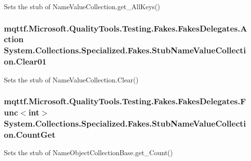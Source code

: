 Sets the stub of Name\-Value\-Collection.\-get\-\_\-\-All\-Keys()

\hypertarget{class_system_1_1_collections_1_1_specialized_1_1_fakes_1_1_stub_name_value_collection_a27dffdd7ba71b6511a9bd481575f807c}{
\subsubsection[{Clear01}]{\setlength{\rightskip}{0pt plus 5cm}mqttf.\-Microsoft.\-Quality\-Tools.\-Testing.\-Fakes.\-Fakes\-Delegates.\-Action System.\-Collections.\-Specialized.\-Fakes.\-Stub\-Name\-Value\-Collection.\-Clear01}}\label{class_system_1_1_collections_1_1_specialized_1_1_fakes_1_1_stub_name_value_collection_a27dffdd7ba71b6511a9bd481575f807c}


Sets the stub of Name\-Value\-Collection.\-Clear()

\hypertarget{class_system_1_1_collections_1_1_specialized_1_1_fakes_1_1_stub_name_value_collection_ae178f5c4fb015139f88001d0e50e035a}{
\subsubsection[{Count\-Get}]{\setlength{\rightskip}{0pt plus 5cm}mqttf.\-Microsoft.\-Quality\-Tools.\-Testing.\-Fakes.\-Fakes\-Delegates.\-Func$<$int$>$ System.\-Collections.\-Specialized.\-Fakes.\-Stub\-Name\-Value\-Collection.\-Count\-Get}}\label{class_system_1_1_collections_1_1_specialized_1_1_fakes_1_1_stub_name_value_collection_ae178f5c4fb015139f88001d0e50e035a}


Sets the stub of Name\-Object\-Collection\-Base.\-get\-\_\-\-Count()

